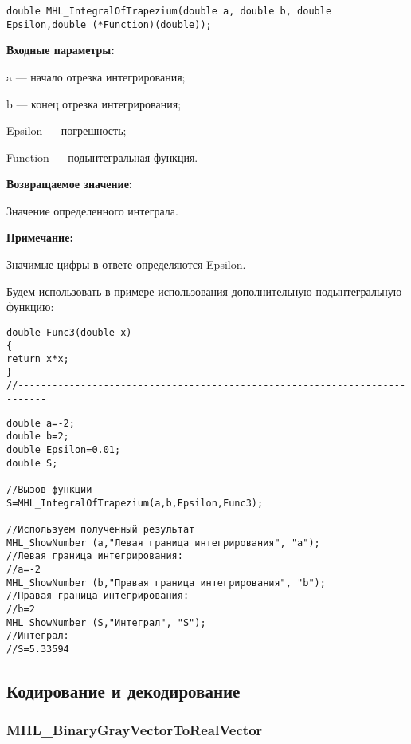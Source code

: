 \documentclass[a4paper,12pt]{article}
\begin{document}
\begin{lstlisting}[label=code_syntax_MHL_IntegralOfTrapezium,caption=Синтаксис]
double MHL_IntegralOfTrapezium(double a, double b, double Epsilon,double (*Function)(double));
\end{lstlisting}

\textbf{Входные параметры:}

 a --- начало отрезка интегрирования;
 
 b --- конец отрезка интегрирования;
 
 Epsilon --- погрешность;
 
 Function --- подынтегральная функция.

\textbf{Возвращаемое значение:}
 
 Значение определенного интеграла.
 
 \textbf{Примечание:}
 
 Значимые цифры в ответе определяются Epsilon.

Будем использовать в примере использования дополнительную подынтегральную функцию:

\begin{lstlisting}[caption=Дополнительная функция]
double Func3(double x)
{
return x*x;
}
//---------------------------------------------------------------------------
\end{lstlisting}


\begin{lstlisting}[label=code_use_MHL_IntegralOfTrapezium,caption=Пример использования]
double a=-2;
double b=2;
double Epsilon=0.01;
double S;

//Вызов функции
S=MHL_IntegralOfTrapezium(a,b,Epsilon,Func3);

//Используем полученный результат
MHL_ShowNumber (a,"Левая граница интегрирования", "a");
//Левая граница интегрирования:
//a=-2
MHL_ShowNumber (b,"Правая граница интегрирования", "b");
//Правая граница интегрирования:
//b=2
MHL_ShowNumber (S,"Интеграл", "S");
//Интеграл:
//S=5.33594
\end{lstlisting}

\subsection{Кодирование и декодирование}

\subsubsection{MHL\_BinaryGrayVectorToRealVector}\label{MHL_BinaryGrayVectorToRealVector}
\end{document}
